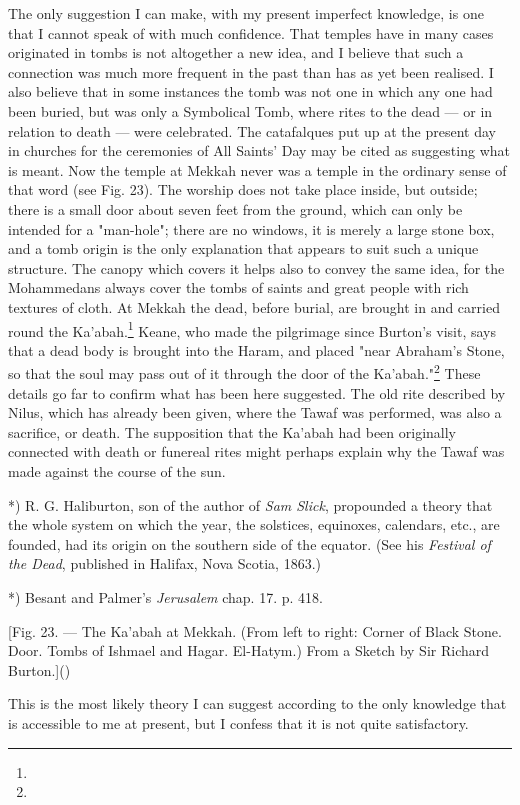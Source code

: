 \documentclass[a4paper, 11pt, oneside, polutonikogreek, english]{article}
\begin{document}
The only suggestion I can make, with my present imperfect knowledge, is one that I cannot speak of with much confidence. That temples have in many cases originated in tombs is not altogether a new idea, and I believe that such a connection was much more frequent in the past than has as yet been realised. I also believe that in some instances the tomb was not one in which any one had been buried, but was only a Symbolical Tomb, where rites to the dead --- or in relation to death --- were celebrated. The catafalques put up at the present day in churches for the ceremonies of All Saints' Day may be cited as suggesting what is meant. Now the temple at Mekkah never was a temple in the ordinary sense of that word (see Fig. 23). The worship does not take place inside, but outside; there is a small door about seven feet from the ground, which can only be intended for a "man-hole"; there are no windows, it is merely a large stone box, and a tomb origin is the only explanation that appears to suit such a unique structure. The canopy which covers it helps also to convey the same idea, for the Mohammedans always cover the tombs of saints and great people with rich textures of cloth. At Mekkah the dead, before burial, are brought in and carried round the Ka'abah.\footnote{} Keane, who made the pilgrimage since Burton's visit, says that a dead body is brought into the Haram, and placed "near Abraham's Stone, so that the soul may pass out of it through the door of the Ka'abah."\footnote{} These details go far to confirm what has been here suggested. The old rite described by Nilus, which has already been given, where the Tawaf was performed, was also a sacrifice, or death. The supposition that the Ka'abah had been originally connected with death or funereal rites might perhaps explain why the Tawaf was made against the course of the sun.

*) R. G. Haliburton, son of the author of \emph{Sam Slick}, propounded a theory that the whole system on which the year, the solstices, equinoxes, calendars, etc., are founded, had its origin on the southern side of the equator. (See his \emph{Festival of the Dead}, published in Halifax, Nova Scotia, 1863.)

*) Besant and Palmer's \emph{Jerusalem} chap. 17. p. 418. 

[Fig. 23. --- The Ka'abah at Mekkah. (From left to right: Corner of Black Stone. Door. Tombs of Ishmael and Hagar. El-Hatym.) From a Sketch by Sir Richard Burton.]()

This is the most likely theory I can suggest according to the only knowledge that is accessible to me at present, but I confess that it is not quite satisfactory.
\end{document}
